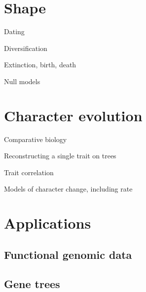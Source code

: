 \documentclass[
]{book}
\begin{document}
\hypertarget{shape}{%
\chapter{Shape}\label{shape}}

Dating

Diversification

Extinction, birth, death

Null models

\hypertarget{character-evolution}{%
\chapter{Character evolution}\label{character-evolution}}

Comparative biology

Reconstructing a single trait on trees

Trait correlation

Models of character change, including rate

\hypertarget{applications}{%
\chapter{Applications}\label{applications}}

\hypertarget{functional-genomic-data}{%
\section{Functional genomic data}\label{functional-genomic-data}}

\hypertarget{gene-trees}{%
\section{Gene trees}\label{gene-trees}}

  
\end{document}
